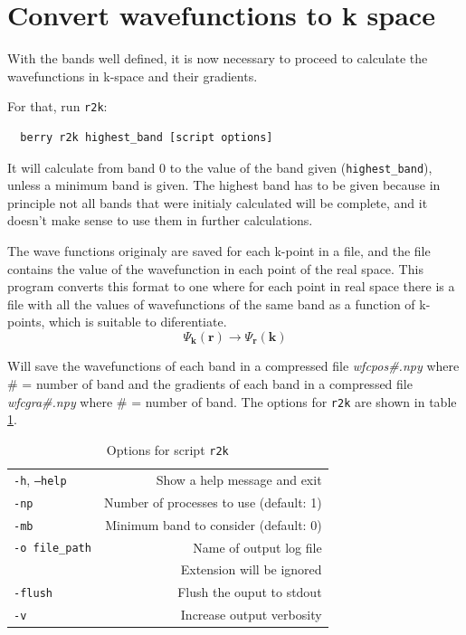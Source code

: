 \documentclass[a4paper,12pt]{report}
\begin{document}
\section{Convert wavefunctions to k space}

With the bands well defined, it is now necessary to proceed to calculate the wavefunctions in k-space and their gradients.

For that, run \texttt{r2k}:
\begin{verbatim}
  berry r2k highest_band [script options]
 \end{verbatim}

It will calculate from band 0 to the value of the band given (\texttt{highest\_band}),
unless a minimum band is given.
The highest band has to be given because in principle not all bands that were initialy calculated will
be complete, and it doesn't make sense to use them in further calculations.

The wave functions originaly are saved for each k-point in a file, and the file contains the value of the wavefunction in each
point of the real space.
This program converts this format to one where for each point in real space there is a file with all the values of wavefunctions
of the same band as a function of k-points, which is suitable to diferentiate.
\begin{equation*}
 \Psi_{\pmb{k}}(\pmb{r}) \rightarrow \Psi_{\pmb{r}}(\pmb{k})
\end{equation*}

Will save the wavefunctions of each band in a compressed file \emph{wfcpos\#.npy} where \# = number of band
and the gradients of each band in a compressed file \emph{wfcgra\#.npy} where \# = number of band.
The options for \texttt{r2k} are shown in table \ref{tab:options_r2k}.

\begin{table}[h]
 \centering
 \caption{Options for script \texttt{r2k}}\label{tab:options_r2k}
\begin{tabular}[]{lr}
\hline
  \texttt{-h}, \texttt{--help}  &\hspace*{2cm} Show a help message and exit \\
  \texttt{-np}                  & Number of processes to use (default: 1) \\
  \texttt{-mb}                  & Minimum band to consider (default: 0) \\
  \texttt{-o file\_path}        & Name of output log file\\
                                & Extension will be ignored\\
  \texttt{-flush}               & Flush the ouput to stdout \\
  \texttt{-v}                   & Increase output verbosity \\
  \hline
\end{tabular}
\end{table}
\end{document}
